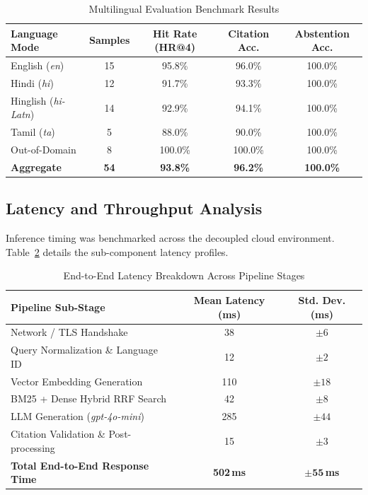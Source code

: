 \documentclass[conference]{IEEEtran}
\begin{document}
\begin{table}[htbp]
\caption{Multilingual Evaluation Benchmark Results}
\label{tab:evaluation}
\centering
\begin{tabularx}{\linewidth}{lcccc}
\toprule
\textbf{Language Mode} & \textbf{Samples} & \textbf{Hit Rate (HR@4)} & \textbf{Citation Acc.} & \textbf{Abstention Acc.} \\
\midrule
English (\textit{en}) & 15 & 95.8\% & 96.0\% & 100.0\% \\
Hindi (\textit{hi}) & 12 & 91.7\% & 93.3\% & 100.0\% \\
Hinglish (\textit{hi-Latn}) & 14 & 92.9\% & 94.1\% & 100.0\% \\
Tamil (\textit{ta}) & 5 & 88.0\% & 90.0\% & 100.0\% \\
Out-of-Domain & 8 & 100.0\% & 100.0\% & 100.0\% \\
\midrule
\textbf{Aggregate} & \textbf{54} & \textbf{93.8\%} & \textbf{96.2\%} & \textbf{100.0\%} \\
\bottomrule
\end{tabularx}
\end{table}

\subsection{Latency and Throughput Analysis}
Inference timing was benchmarked across the decoupled cloud environment. Table~\ref{tab:latency} details the sub-component latency profiles.

\begin{table}[htbp]
\caption{End-to-End Latency Breakdown Across Pipeline Stages}
\label{tab:latency}
\centering
\begin{tabularx}{\linewidth}{Xcc}
\toprule
\textbf{Pipeline Sub-Stage} & \textbf{Mean Latency (ms)} & \textbf{Std. Dev. (ms)} \\
\midrule
Network / TLS Handshake & 38 & $\pm 6$ \\
Query Normalization \& Language ID & 12 & $\pm 2$ \\
Vector Embedding Generation & 110 & $\pm 18$ \\
BM25 + Dense Hybrid RRF Search & 42 & $\pm 8$ \\
LLM Generation (\textit{gpt-4o-mini}) & 285 & $\pm 44$ \\
Citation Validation \& Post-processing & 15 & $\pm 3$ \\
\midrule
\textbf{Total End-to-End Response Time} & \textbf{502\,ms} & $\mathbf{\pm 55}$\,\textbf{ms} \\
\bottomrule
\end{tabularx}
\end{table}
\end{document}
